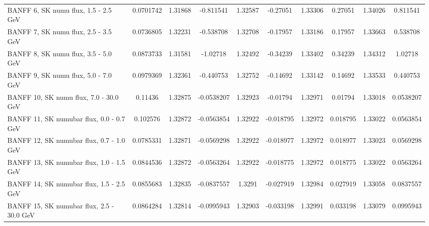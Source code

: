 \documentclass{standalone}
\begin{document}
\begin{tabular}{| l | S | S  S | S  S | S  S | S  S | }
                                           BANFF  6, SK numu flux, 1.5 - 2.5 GeV &       0.0701742 &         1.31868 &       -0.811541 &         1.32587 &        -0.27051 &         1.33306 &         0.27051 &         1.34026 &        0.811541 \\ 
                                           BANFF  7, SK numu flux, 2.5 - 3.5 GeV &       0.0736805 &         1.32231 &       -0.538708 &         1.32708 &        -0.17957 &         1.33186 &         0.17957 &         1.33663 &        0.538708 \\ 
                                           BANFF  8, SK numu flux, 3.5 - 5.0 GeV &       0.0873733 &         1.31581 &        -1.02718 &         1.32492 &        -0.34239 &         1.33402 &         0.34239 &         1.34312 &         1.02718 \\ 
                                           BANFF  9, SK numu flux, 5.0 - 7.0 GeV &       0.0979369 &         1.32361 &       -0.440753 &         1.32752 &        -0.14692 &         1.33142 &         0.14692 &         1.33533 &        0.440753 \\ 
                                          BANFF 10, SK numu flux, 7.0 - 30.0 GeV &         0.11436 &         1.32875 &      -0.0538207 &         1.32923 &        -0.01794 &         1.32971 &         0.01794 &         1.33018 &       0.0538207 \\ 
                                        BANFF 11, SK numubar flux, 0.0 - 0.7 GeV &        0.102576 &         1.32872 &      -0.0563854 &         1.32922 &       -0.018795 &         1.32972 &        0.018795 &         1.33022 &       0.0563854 \\ 
                                        BANFF 12, SK numubar flux, 0.7 - 1.0 GeV &       0.0785331 &         1.32871 &      -0.0569298 &         1.32922 &       -0.018977 &         1.32972 &        0.018977 &         1.33023 &       0.0569298 \\ 
                                        BANFF 13, SK numubar flux, 1.0 - 1.5 GeV &       0.0844536 &         1.32872 &      -0.0563264 &         1.32922 &       -0.018775 &         1.32972 &        0.018775 &         1.33022 &       0.0563264 \\ 
                                        BANFF 14, SK numubar flux, 1.5 - 2.5 GeV &       0.0855683 &         1.32835 &      -0.0837557 &          1.3291 &       -0.027919 &         1.32984 &        0.027919 &         1.33058 &       0.0837557 \\ 
                                       BANFF 15, SK numubar flux, 2.5 - 30.0 GeV &       0.0864284 &         1.32814 &      -0.0995943 &         1.32903 &       -0.033198 &         1.32991 &        0.033198 &         1.33079 &       0.0995943 \\ 

\end{tabular}
\end{document}
